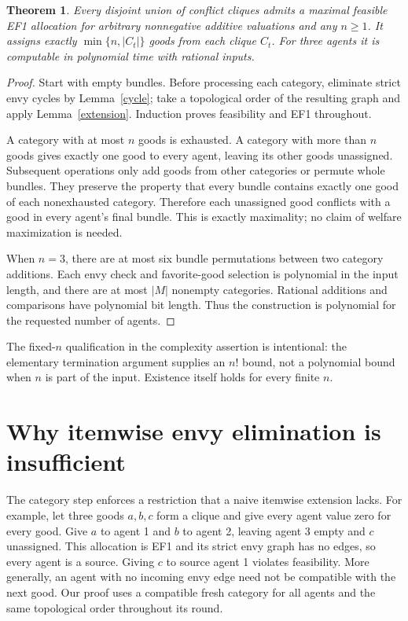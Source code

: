 \documentclass[11pt]{article}
\newtheorem{theorem}{Theorem}
\theoremstyle{remark}
\begin{document}
\begin{theorem}\label{main}
Every disjoint union of conflict cliques admits a maximal feasible EF1 allocation for arbitrary nonnegative additive valuations and any $n\geq1$. It assigns exactly $\min\{n,|C_t|\}$ goods from each clique $C_t$. For three agents it is computable in polynomial time with rational inputs.
\end{theorem}
\begin{proof}
Start with empty bundles. Before processing each category, eliminate strict envy cycles by Lemma~\ref{cycle}; take a topological order of the resulting graph and apply Lemma~\ref{extension}. Induction proves feasibility and EF1 throughout.

A category with at most $n$ goods is exhausted. A category with more than $n$ goods gives exactly one good to every agent, leaving its other goods unassigned. Subsequent operations only add goods from other categories or permute whole bundles. They preserve the property that every bundle contains exactly one good of each nonexhausted category. Therefore each unassigned good conflicts with a good in every agent's final bundle. This is exactly maximality; no claim of welfare maximization is needed.

When $n=3$, there are at most six bundle permutations between two category additions. Each envy check and favorite-good selection is polynomial in the input length, and there are at most $|M|$ nonempty categories. Rational additions and comparisons have polynomial bit length. Thus the construction is polynomial for the requested number of agents.
\end{proof}

The fixed-$n$ qualification in the complexity assertion is intentional: the elementary termination argument supplies an $n!$ bound, not a polynomial bound when $n$ is part of the input. Existence itself holds for every finite $n$.

\section{Why itemwise envy elimination is insufficient}
The category step enforces a restriction that a naive itemwise extension lacks. For example, let three goods $a,b,c$ form a clique and give every agent value zero for every good. Give $a$ to agent 1 and $b$ to agent 2, leaving agent 3 empty and $c$ unassigned. This allocation is EF1 and its strict envy graph has no edges, so every agent is a source. Giving $c$ to source agent 1 violates feasibility. More generally, an agent with no incoming envy edge need not be compatible with the next good. Our proof uses a compatible fresh category for all agents and the same topological order throughout its round.
\end{document}
